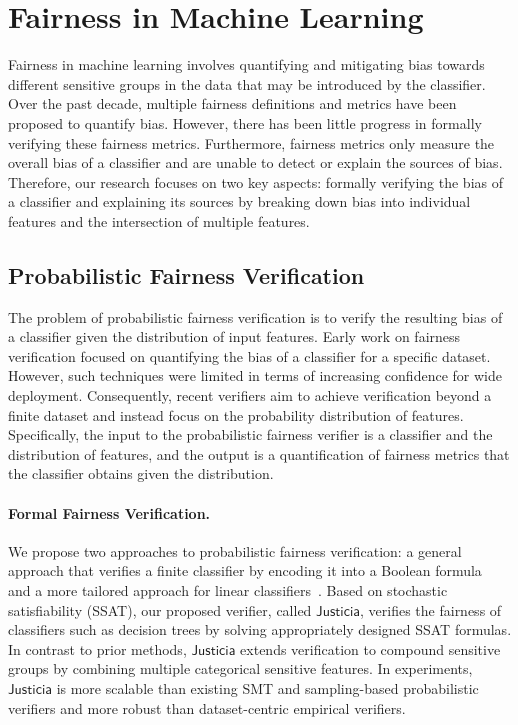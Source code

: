 \documentclass{article}
\begin{document}
\section{Fairness in Machine Learning}

Fairness in machine learning involves quantifying and mitigating bias towards different sensitive groups in the data that may be introduced by the classifier. Over the past decade, multiple fairness definitions and metrics have been proposed to quantify bias. However, there has been little progress in formally verifying these fairness metrics. Furthermore, fairness metrics only measure the overall bias of a classifier and are unable to detect or explain the sources of bias. Therefore, our research focuses on two key aspects: formally verifying the bias of a classifier and explaining its sources by breaking down bias into individual features and the intersection of multiple features.

\subsection*{Probabilistic Fairness Verification} The problem of probabilistic fairness verification is to verify the resulting bias of a classifier given the distribution of input features. Early work on fairness verification focused on quantifying the bias of a classifier for a specific dataset. However, such techniques were limited in terms of increasing confidence for wide deployment. Consequently, recent verifiers aim to achieve verification beyond a finite dataset and instead focus on the probability distribution of features. Specifically, the input to the probabilistic fairness verifier is a classifier and the distribution of features, and the output is a quantification of fairness metrics that the classifier obtains given the distribution.




\paragraph{Formal Fairness Verification.} We propose two approaches to probabilistic fairness verification: a general approach that verifies a finite classifier by encoding it into a Boolean formula~\cite{ghosh2021justicia} and a more tailored approach for linear classifiers~\cite{ghosh2022algorithmic}. Based on stochastic satisfiability (SSAT), our proposed verifier, called $\mathsf{Justicia}$, verifies the fairness of classifiers such as decision trees by solving appropriately designed SSAT formulas. In contrast to prior methods, $\mathsf{Justicia}$ extends verification to compound sensitive groups by combining multiple categorical sensitive features. In experiments, $\mathsf{Justicia}$ is more scalable than existing SMT and sampling-based probabilistic verifiers and more robust than dataset-centric empirical verifiers.
\end{document}
